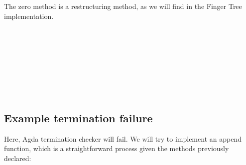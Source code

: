 \documentclass[12pt,twoside,notitlepage]{report}
\begin{document}
The zero method is a restructuring method, as we will find in the Finger Tree implementation.

\begin{code}
\\
\>[0]\<[4]%
\>[4] \AgdaSymbol{:} \AgdaSymbol{\{} \AgdaSymbol{:}   \AgdaSymbol{\}} \AgdaSymbol{\{} \AgdaSymbol{:} \AgdaSymbol{\}} \<%
\\
\>[4]\<[6]%
\>[6] \AgdaSymbol{(} \AgdaSymbol{)}  \<%
\\
\>[4]\<[6]%
\>[6]  \<%
\\
\>[0]\<[4]%
\>[4]  \AgdaSymbol{=} \<%
\\
\>[0]\<[4]%
\>[4] \AgdaSymbol{(}  \AgdaSymbol{)} \AgdaSymbol{=}   \AgdaSymbol{(} \AgdaSymbol{)}\<%
\\
\>[0]\<[4]%
\>[4] \AgdaSymbol{(} \AgdaSymbol{(}  \AgdaSymbol{)} \AgdaSymbol{)} \AgdaSymbol{=}   \AgdaSymbol{(}  \AgdaSymbol{)}\<%
\\
\end{code} 

\subsection{Example termination failure}

Here, Agda termination checker will fail. We will try to implement an append function, which is a straightforward process given the methods previously declared:
\end{document}

